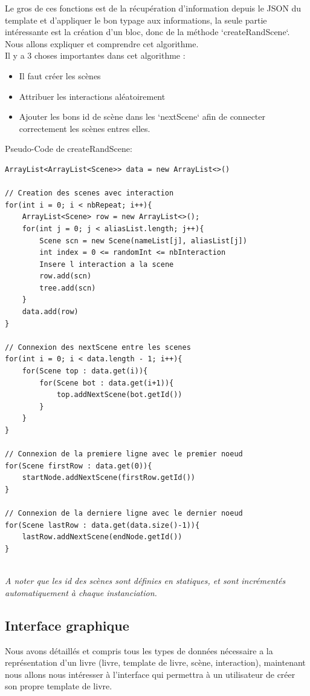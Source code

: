 \documentclass[12pt]{article}
\begin{document}
Le gros de ces fonctions est de la récupération d'information depuis le JSON du template et d'appliquer le bon typage aux informations, la seule partie intéressante est la création d'un bloc, donc de la méthode `createRandScene`. Nous allons expliquer et comprendre cet algorithme.\\

Il y a 3 choses importantes dans cet algorithme :\\
\begin{itemize}
    \item Il faut créer les scènes
    \item Attribuer les interactions aléatoirement
    \item Ajouter les bons id de scène dans les `nextScene` afin de connecter correctement les scènes entres elles.\\
\end{itemize}
Pseudo-Code de createRandScene:
\begin{lstlisting}
ArrayList<ArrayList<Scene>> data = new ArrayList<>()

// Creation des scenes avec interaction
for(int i = 0; i < nbRepeat; i++){
    ArrayList<Scene> row = new ArrayList<>();
    for(int j = 0; j < aliasList.length; j++){
        Scene scn = new Scene(nameList[j], aliasList[j])
        int index = 0 <= randomInt <= nbInteraction
        Insere l interaction a la scene
        row.add(scn)
        tree.add(scn)
    }
    data.add(row)
}

// Connexion des nextScene entre les scenes
for(int i = 0; i < data.length - 1; i++){
    for(Scene top : data.get(i)){
        for(Scene bot : data.get(i+1)){
            top.addNextScene(bot.getId())
        }
    }
}

// Connexion de la premiere ligne avec le premier noeud
for(Scene firstRow : data.get(0)){
    startNode.addNextScene(firstRow.getId())
}

// Connexion de la derniere ligne avec le dernier noeud
for(Scene lastRow : data.get(data.size()-1)){
    lastRow.addNextScene(endNode.getId())
}
\end{lstlisting}

\textit{\\A noter que les id des scènes sont définies en statiques, et sont incrémentés automatiquement à chaque instanciation.}
\newpage
\subsection{Interface graphique}
Nous avons détaillés et compris tous les types de données nécessaire a la représentation d'un livre (livre, template de livre, scène, interaction), maintenant nous allons nous intéresser à l'interface qui permettra à un utilisateur de créer son propre template de livre.\\
\end{document}
